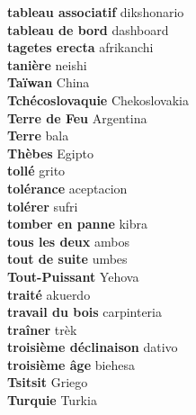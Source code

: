 \textbf{ tableau associatif  } dikshonario \\
\textbf{ tableau de bord  } dashboard \\
\textbf{ tagetes erecta  } afrikanchi \\
\textbf{ tanière  } neishi \\
\textbf{ Taïwan  } China \\
\textbf{ Tchécoslovaquie  } Chekoslovakia \\
\textbf{ Terre de Feu  } Argentina \\
\textbf{ Terre  } bala \\
\textbf{ Thèbes  } Egipto \\
\textbf{ tollé  } grito \\
\textbf{ tolérance  } aceptacion \\
\textbf{ tolérer  } sufri \\
\textbf{ tomber en panne  } kibra \\
\textbf{ tous les deux  } ambos \\
\textbf{ tout de suite  } umbes \\
\textbf{ Tout-Puissant  } Yehova \\
\textbf{ traité  } akuerdo \\
\textbf{ travail du bois  } carpinteria \\
\textbf{ traîner  } trèk \\
\textbf{ troisième déclinaison  } dativo \\
\textbf{ troisième âge  } biehesa \\
\textbf{ Tsitsit  } Griego \\
\textbf{ Turquie  } Turkia \\
